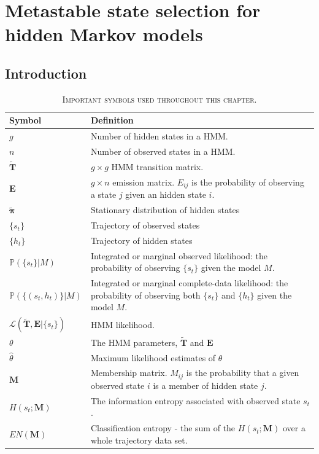 \let\textcircled=\pgftextcircled
\chapter{Metastable state selection for hidden Markov models}
\label{chap:hmm}




\section{Introduction}
\begin{table}
    \centering
    \begin{tabularx}{0.9\textwidth}{ l >{\raggedright\arraybackslash}X } 
    \hline
    \textbf{Symbol}  &  \textbf{Definition} \\
    \hline\hline
    $g$ & Number of hidden states in a HMM. \\
    $n$ & Number of observed states in a HMM. \\
    $\mathbf{\tilde{T}}$ & $g\times g$ HMM transition matrix. \\
    $\mathbf{E}$ & $g \times n$ emission matrix. $E_{ij}$ is the probability of observing a state $j$ given an hidden state $i$. \\
    $\tilde{\bm{\pi}}$ & Stationary distribution of hidden states \\
    $\{s_{t}\}$ & Trajectory of observed states \\
    $\{h_{t}\}$ & Trajectory of hidden states \\
    $\mathbb{P}(\{s_t\}|M)$ & Integrated or marginal observed likelihood: the probability of observing $\{s_t\}$ given the model $M$. \\
    $\mathbb{P}(\{(s_t, h_t)\}|M)$ & Integrated or marginal complete-data likelihood: the probability of observing both $\{s_t\}$ and $\{h_t\}$ given the model $M$.  \\
    $\mathcal{L}\left(\tilde{\mathbf{T}}, \mathbf{E}| \{s_t\}\right)$ &  HMM likelihood. \\
    $\theta$ & The HMM parameters, $\tilde{\mathbf{T}}$ and $\mathbf{E}$\\
    $\hat{\theta}$ & Maximum likelihood estimates of $\theta$ \\
    $\mathbf{M}$ & Membership matrix. $M_{ij}$ is the probability that a given observed state $i$ is a member of hidden state $j$. \\
    $H(s_{t}; \mathbf{M})$ & The information entropy associated with observed state $s_{t}$. \\
    $EN(\mathbf{M})$ & Classification entropy - the sum of the $H(s_{t}; \mathbf{M})$ over a whole trajectory data set. \\
    \hline
    \end{tabularx}
    \caption[Important symbols]{\textsc{Important symbols used throughout this chapter}.}

    \label{tab:hmm_symbols}
\end{table}


